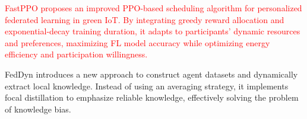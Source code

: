 \documentclass[journal,twoside,web]{ieeecolor}
\newcommand{\rev}[1]{\textcolor{red}{#1}}
\begin{document}
\rev{FastPPO\cite{fastppo} proposes an improved PPO-based scheduling algorithm for personalized federated learning in green IoT. By integrating greedy reward allocation and exponential-decay training duration, it adapts to participants’ dynamic resources and preferences, maximizing FL model accuracy while optimizing energy efficiency and participation willingness.}

FedDyn\cite{feddyn} introduces a new approach to construct agent datasets and dynamically extract local knowledge. Instead of using an averaging strategy, it implements focal distillation to emphasize reliable knowledge, effectively solving the problem of knowledge bias.





\end{document}

